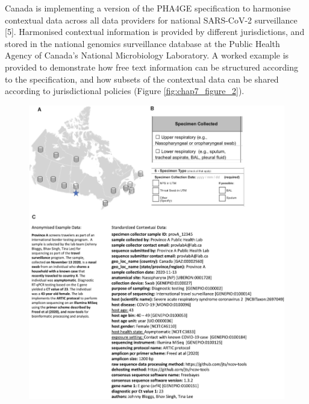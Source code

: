 Canada is implementing a version of the PHA4GE specification to harmonise contextual data across all data providers for national SARS-CoV-2 surveillance [5]. Harmonised contextual information is provided by different jurisdictions, and stored in the national genomics surveillance database at the Public Health Agency of Canada’s National Microbiology Laboratory. A worked example is provided to demonstrate how free text information can be structured according to the specification, and how subsets of the contextual data can be shared according to jurisdictional policies (Figure \ref{fig:chap7_figure_2}). 

\begin{figure}[]
\centering
\includegraphics[width=\textwidth]{figures/chapter 7/giac003fig2.jpeg}

\end{figure}
